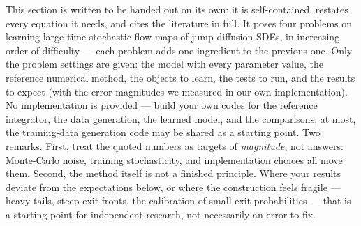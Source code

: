 \documentclass[11pt]{article}
\begin{document}
This section is written to be handed out on its own: it is self-contained,
restates every equation it needs, and cites the literature in full. It
poses four problems on learning large-time stochastic flow maps of
jump-diffusion SDEs, in increasing order of difficulty --- each problem
adds one ingredient to the previous one. Only the problem settings are
given: the model with every parameter value, the reference numerical
method, the objects to learn, the tests to run, and the results to expect
(with the error magnitudes we measured in our own implementation). No
implementation is provided --- build your own codes for the reference
integrator, the data generation, the learned model, and the comparisons;
at most, the training-data generation code may be shared as a starting
point. Two remarks. First, treat the quoted numbers as targets of
\emph{magnitude}, not answers: Monte-Carlo noise, training stochasticity,
and implementation choices all move them. Second, the method itself is
not a finished principle. Where your results deviate from the
expectations below, or where the construction feels fragile --- heavy
tails, steep exit fronts, the calibration of small exit probabilities ---
that is a starting point for independent research, not necessarily an
error to fix.
\end{document}
